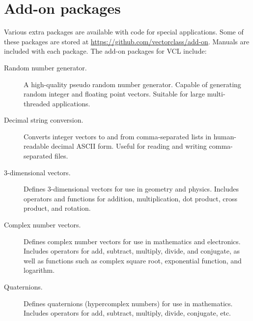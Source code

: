 \documentclass[vcl_manual.tex]{subfiles}
\begin{document}
\chapter{Add-on packages}\label{chap:AddOnPackages}
\flushleft

Various extra packages are available with code for special applications. 
Some of these packages are stored at 
\url{https://github.com/vectorclass/add-on}.
Manuals are included with each package. The add-on packages for VCL include:

\begin{description}

\item[Random number generator.] 
   A high-quality pseudo random number generator. Capable of generating random integer and floating point vectors. Suitable for large multi-threaded applications.

\item[Decimal string conversion.] 
   Converts integer vectors to and from comma-separated lists in human-readable decimal ASCII form. Useful for reading and writing comma-separated files.

\item[3-dimensional vectors.] 
   Defines 3-dimensional vectors for use in geometry and physics. 
   Includes operators and functions for addition, multiplication, dot product, cross product, and rotation.
   
\item[Complex number vectors.]    
   Defines complex number vectors for use in mathematics and electronics. 
   Includes operators for add, subtract, multiply, divide, and conjugate, as well as functions such as complex square root, exponential function, and logarithm.
   
\item[Quaternions.]    
   Defines quaternions (hypercomplex numbers) for use in mathematics.
   Includes operators for add, subtract, multiply, divide, conjugate, etc.




\end{description}
\end{document}
